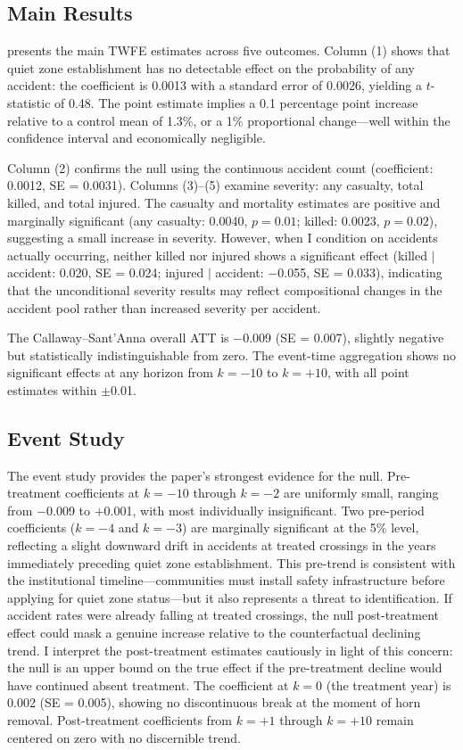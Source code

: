 \documentclass[12pt]{article}
\begin{document}
\subsection{Main Results}

 presents the main TWFE estimates across five outcomes. Column (1) shows that quiet zone establishment has no detectable effect on the probability of any accident: the coefficient is 0.0013 with a standard error of 0.0026, yielding a $t$-statistic of 0.48. The point estimate implies a 0.1 percentage point increase relative to a control mean of 1.3\%, or a 1\% proportional change---well within the confidence interval and economically negligible.

Column (2) confirms the null using the continuous accident count (coefficient: 0.0012, SE = 0.0031). Columns (3)--(5) examine severity: any casualty, total killed, and total injured. The casualty and mortality estimates are positive and marginally significant (any casualty: 0.0040, $p = 0.01$; killed: 0.0023, $p = 0.02$), suggesting a small increase in severity. However, when I condition on accidents actually occurring, neither killed nor injured shows a significant effect (killed $|$ accident: 0.020, SE = 0.024; injured $|$ accident: $-$0.055, SE = 0.033), indicating that the unconditional severity results may reflect compositional changes in the accident pool rather than increased severity per accident.

The Callaway--Sant'Anna overall ATT is $-$0.009 (SE = 0.007), slightly negative but statistically indistinguishable from zero. The event-time aggregation shows no significant effects at any horizon from $k = -10$ to $k = +10$, with all point estimates within $\pm$0.01.




\subsection{Event Study}

The event study provides the paper's strongest evidence for the null. Pre-treatment coefficients at $k = -10$ through $k = -2$ are uniformly small, ranging from $-$0.009 to $+$0.001, with most individually insignificant. Two pre-period coefficients ($k = -4$ and $k = -3$) are marginally significant at the 5\% level, reflecting a slight downward drift in accidents at treated crossings in the years immediately preceding quiet zone establishment. This pre-trend is consistent with the institutional timeline---communities must install safety infrastructure before applying for quiet zone status---but it also represents a threat to identification. If accident rates were already falling at treated crossings, the null post-treatment effect could mask a genuine increase relative to the counterfactual declining trend. I interpret the post-treatment estimates cautiously in light of this concern: the null is an upper bound on the true effect if the pre-treatment decline would have continued absent treatment. The coefficient at $k = 0$ (the treatment year) is 0.002 (SE = 0.005), showing no discontinuous break at the moment of horn removal. Post-treatment coefficients from $k = +1$ through $k = +10$ remain centered on zero with no discernible trend.
\end{document}
